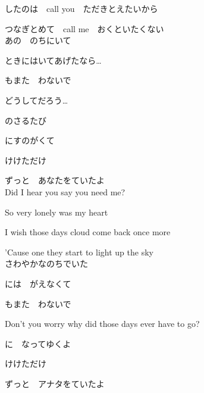 {したのは　call you　ただきとえたいから

つなぎとめて　call me　おくといたくない
\\

あの　のちにいて

ときにはいてあげたなら…

もまた　わないで

どうしてだろう…

のさるたび

にすのがくて

けけただけ

ずっと　あなたをていたよ
\\

Did I hear you say you need me?

So very lonely was my heart

I wish those days cloud come back once more

'Cause one they start to light up the sky
\\

さわやかなのちでいた

には　がえなくて

もまた　わないで

Don't you worry why did those days ever have to go?

に　なってゆくよ

けけただけ

ずっと　アナタをていたよ

}